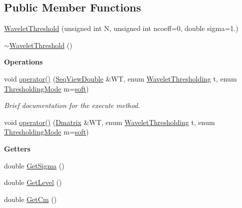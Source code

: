 \subsection*{Public Member Functions}
\begin{DoxyCompactItemize}
\item 
\hyperlink{classtsa_1_1_wavelet_threshold_a2815780145d4327729f21aa42eb08ddc}{Wavelet\+Threshold} (unsigned int N, unsigned int ncoeff=0, double sigma=1.)
\item 
\hyperlink{classtsa_1_1_wavelet_threshold_a7a3219da0f0f814157c7a7c3d41a17cc}{$\sim$\+Wavelet\+Threshold} ()
\end{DoxyCompactItemize}
\begin{Indent}\textbf{ Operations}\par
\begin{DoxyCompactItemize}
\item 
void \hyperlink{classtsa_1_1_wavelet_threshold_a124b4c13b828d8b85500f9c99d5f93ae}{operator()} (\hyperlink{namespacetsa_ac599574bcc094eda25613724b8f3ca9e}{Seq\+View\+Double} \&WT, enum \hyperlink{classtsa_1_1_wavelet_threshold_a50c42c95dae960986a985157ca038fae}{Wavelet\+Thresholding} t, enum \hyperlink{classtsa_1_1_wavelet_threshold_a93d14df024bbc8c3da182bf5899f8f83}{Thresholding\+Mode} m=\hyperlink{classtsa_1_1_wavelet_threshold_a93d14df024bbc8c3da182bf5899f8f83a356244854a142af0e9f3db2cf4ad5192}{soft})
\begin{DoxyCompactList}\small\item\em Brief documentation for the execute method. \end{DoxyCompactList}\item 
void \hyperlink{classtsa_1_1_wavelet_threshold_ae05f0886ef54f3370fc5c91eff2b0de7}{operator()} (\hyperlink{namespacetsa_ad260cd21c1891c4ed391fe788569aba4}{Dmatrix} \&WT, enum \hyperlink{classtsa_1_1_wavelet_threshold_a50c42c95dae960986a985157ca038fae}{Wavelet\+Thresholding} t, enum \hyperlink{classtsa_1_1_wavelet_threshold_a93d14df024bbc8c3da182bf5899f8f83}{Thresholding\+Mode} m=\hyperlink{classtsa_1_1_wavelet_threshold_a93d14df024bbc8c3da182bf5899f8f83a356244854a142af0e9f3db2cf4ad5192}{soft})
\end{DoxyCompactItemize}
\end{Indent}
\begin{Indent}\textbf{ Getters}\par
\begin{DoxyCompactItemize}
\item 
double \hyperlink{classtsa_1_1_wavelet_threshold_a219b1dbce4e92a84e8078a839b75c4c3}{Get\+Sigma} ()
\item 
double \hyperlink{classtsa_1_1_wavelet_threshold_a2b6e84938c13629e11a9f31b26c34eb9}{Get\+Level} ()
\item 
double \hyperlink{classtsa_1_1_wavelet_threshold_aa2a36e1131551abc41b02c4e6a4352c7}{Get\+Cm} ()
\end{DoxyCompactItemize}
\end{Indent}
